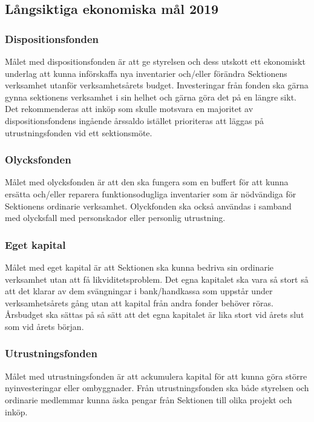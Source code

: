 \documentclass[../_main/handlingar.tex]{subfiles}
\begin{document}
\newpage
\subsection*{Långsiktiga ekonomiska mål 2019}

\subsubsection*{Dispositionsfonden}
Målet med dispositionsfonden är att ge styrelsen och dess utskott ett ekonomiskt underlag att kunna införskaffa nya inventarier och/eller förändra Sektionens verksamhet utanför verksamhetsårets budget. Investeringar från fonden ska gärna gynna sektionens verksamhet i sin helhet och gärna göra det på en längre sikt. Det rekommenderas att inköp som skulle motsvara en majoritet av dispositionsfondens ingående årssaldo istället prioriteras att läggas på utrustningsfonden vid ett sektionsmöte.

\subsubsection*{Olycksfonden}
Målet med olycksfonden är att den ska fungera som en buffert för att kunna ersätta och/eller reparera funktionsodugliga inventarier som är nödvändiga för Sektionens ordinarie verksamhet. Olyckfonden ska också användas i samband med olycksfall med personskador eller personlig utrustning.

\subsubsection*{Eget kapital}
Målet med eget kapital är att Sektionen ska kunna bedriva sin ordinarie verksamhet utan att få likviditetsproblem. Det egna kapitalet ska vara så stort så att det klarar av dem svängningar i bank/handkassa som uppstår under verksamhetsårets gång utan att kapital från andra fonder behöver röras. Årsbudget ska sättas på så sätt att det egna kapitalet är lika stort vid årets slut som vid årets början.

\subsubsection*{Utrustningsfonden}
Målet med utrustningsfonden är att ackumulera kapital för att kunna göra större nyinvesteringar eller ombyggnader. Från utrustningsfonden ska både styrelsen och ordinarie medlemmar kunna äska pengar från Sektionen till olika projekt och inköp.
\end{document}

